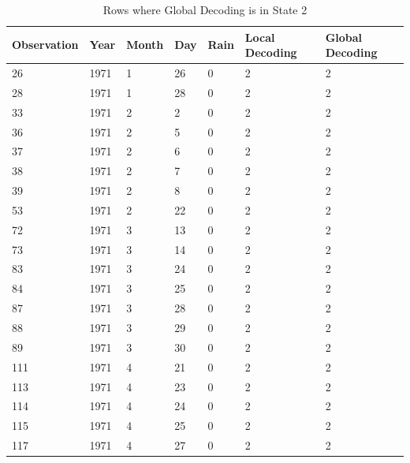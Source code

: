 \documentclass{article}
\begin{document}
\begin{table}[]
  \centering
  \begin{tabular}{lllllll}
    \toprule
    Observation & Year & Month & Day & Rain & Local Decoding & Global Decoding \\
    \midrule
    26          & 1971 & 1     & 26  & 0    & 2              & 2               \\
    28          & 1971 & 1     & 28  & 0    & 2              & 2               \\
    33          & 1971 & 2     & 2   & 0    & 2              & 2               \\
    36          & 1971 & 2     & 5   & 0    & 2              & 2               \\
    37          & 1971 & 2     & 6   & 0    & 2              & 2               \\
    38          & 1971 & 2     & 7   & 0    & 2              & 2               \\
    39          & 1971 & 2     & 8   & 0    & 2              & 2               \\
    53          & 1971 & 2     & 22  & 0    & 2              & 2               \\
    72          & 1971 & 3     & 13  & 0    & 2              & 2               \\
    73          & 1971 & 3     & 14  & 0    & 2              & 2               \\
    83          & 1971 & 3     & 24  & 0    & 2              & 2               \\
    84          & 1971 & 3     & 25  & 0    & 2              & 2               \\
    87          & 1971 & 3     & 28  & 0    & 2              & 2               \\
    88          & 1971 & 3     & 29  & 0    & 2              & 2               \\
    89          & 1971 & 3     & 30  & 0    & 2              & 2               \\
    111         & 1971 & 4     & 21  & 0    & 2              & 2               \\
    113         & 1971 & 4     & 23  & 0    & 2              & 2               \\
    114         & 1971 & 4     & 24  & 0    & 2              & 2               \\
    115         & 1971 & 4     & 25  & 0    & 2              & 2               \\
    117         & 1971 & 4     & 27  & 0    & 2              & 2 \\
    \bottomrule
  \end{tabular}
  \caption{Rows where Global Decoding is in State 2}\label{tbl:hmm_state_2}
\end{table}
\end{document}
